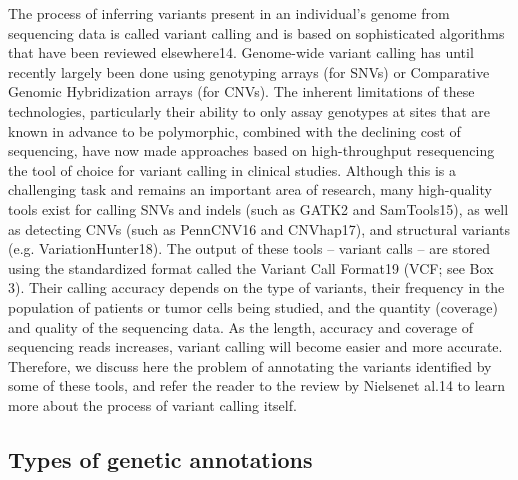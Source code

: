 The process of inferring variants present in an individual’s genome from sequencing data is called variant calling and is based on sophisticated algorithms that have been reviewed elsewhere14. Genome-wide variant calling has until recently largely been done using genotyping arrays (for SNVs) or Comparative Genomic Hybridization arrays (for CNVs). The inherent limitations of these technologies, particularly their ability to only assay genotypes at sites that are known in advance to be polymorphic, combined with the declining cost of sequencing, have now made approaches based on high-throughput resequencing the tool of choice for variant calling in clinical studies. Although this is a challenging task and remains an important area of research, many high-quality tools exist for calling SNVs and indels (such as GATK2 and SamTools15), as well as detecting CNVs (such as PennCNV16 and CNVhap17), and structural variants (e.g. VariationHunter18). The output of these tools – variant calls – are stored using the standardized format called the Variant Call Format19 (VCF; see Box 3). Their calling accuracy depends on the type of variants, their frequency in the population of patients or tumor cells being studied, and the quantity (coverage) and quality of the sequencing data. As the length, accuracy and coverage of sequencing reads increases, variant calling will become easier and more accurate. Therefore, we discuss here the problem of annotating the variants identified by some of these tools, and refer the reader to the review by Nielsenet al.14 to learn more about the process of variant calling itself.

\subsection{Types of genetic annotations}

